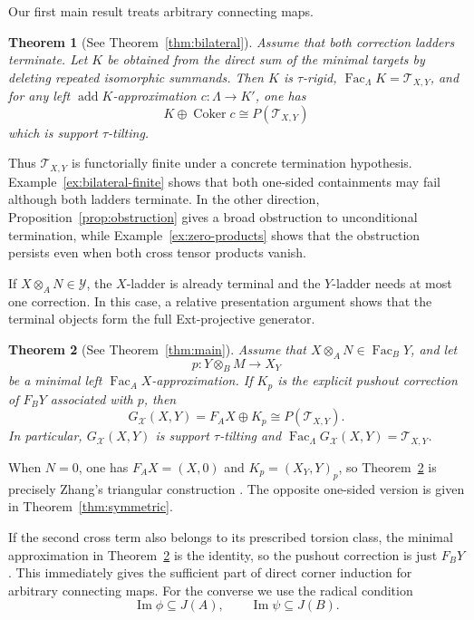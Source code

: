 \documentclass[11pt,reqno]{amsart}
\newtheorem{theorem}{Theorem}[section]
\theoremstyle{definition}
\theoremstyle{remark}
\newcommand{\Fac}{\operatorname{Fac}}
\newcommand{\addc}{\operatorname{add}}
\newcommand{\Coker}{\operatorname{Coker}}
\numberwithin{equation}{section}
\begin{document}
Our first main result treats arbitrary connecting maps.

\begin{theorem}[See Theorem~\ref{thm:bilateral}]
\label{thm:intro-bilateral}
Assume that both correction ladders terminate.  Let $K$ be obtained from the
direct sum of the minimal targets by deleting repeated isomorphic summands.
Then $K$ is $\tau$-rigid, $\Fac_\Lambda K=\mathcal T_{X,Y}$, and for any
left $\addc K$-approximation $c:\Lambda\to K'$, one has
\[
 K\oplus\Coker c
 \cong P(\mathcal T_{X,Y})
\]
which is support $\tau$-tilting.
\end{theorem}

Thus $\mathcal T_{X,Y}$ is functorially finite under a concrete termination
hypothesis.  Example~\ref{ex:bilateral-finite} shows that both one-sided
containments may fail although both ladders terminate.  In the other
direction, Proposition~\ref{prop:obstruction} gives a broad obstruction to
unconditional termination, while Example~\ref{ex:zero-products} shows that
the obstruction persists even when both cross tensor products vanish.

If $X\otimes_AN\in\mathcal Y$, the $X$-ladder is already terminal and
the $Y$-ladder needs at most one correction.  In this case, a relative
presentation argument shows that the terminal objects form the full
Ext-projective generator.

\begin{theorem}[See Theorem~\ref{thm:main}]
\label{thm:intro-one-step}
Assume that $X\otimes_AN\in\Fac_BY$, and let
\[
 p:Y\otimes_BM\longrightarrow X_Y
\]
be a minimal left $\Fac_AX$-approximation.  If $K_p$ is the explicit pushout
correction of $F_BY$ associated with $p$, then
\[
 G_{\mathcal X}(X,Y)=F_AX\oplus K_p
 \cong P(\mathcal T_{X,Y}).
\]
In particular, $G_{\mathcal X}(X,Y)$ is support $\tau$-tilting and
$\Fac_\Lambda G_{\mathcal X}(X,Y)=\mathcal T_{X,Y}$.
\end{theorem}

When $N=0$, one has $F_AX=(X,0)$ and $K_p=(X_Y,Y)_p$, so
Theorem~\ref{thm:intro-one-step} is precisely Zhang's triangular construction
\cite[Theorem~5.1]{Zhang}.  The opposite one-sided version is given in
Theorem~\ref{thm:symmetric}.

If the second cross term also belongs to its prescribed torsion class, the
minimal approximation in Theorem~\ref{thm:intro-one-step} is the identity, so
the pushout correction is just $F_BY$.  This immediately gives the sufficient
part of direct corner induction for arbitrary connecting maps.  For the
converse we use the radical condition
\[
 \operatorname{Im}\phi\subseteq J(A),
 \qquad
 \operatorname{Im}\psi\subseteq J(B).
\]
\end{document}
